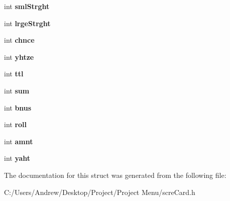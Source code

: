 \begin{DoxyCompactItemize}
int {\bfseries sml\+Strght}
\item 
\mbox{\label{structscre_card_a337ee925dc5831958deb35df999272de}} 
int {\bfseries lrge\+Strght}
\item 
\mbox{\label{structscre_card_a51c57ac55b54259138ee5050737870f3}} 
int {\bfseries chnce}
\item 
\mbox{\label{structscre_card_a8e09c3ec5e587e509d328af285e028b8}} 
int {\bfseries yhtze}
\item 
\mbox{\label{structscre_card_abbef5f6461fd43f42b5cbc3d80201965}} 
int {\bfseries ttl}
\item 
\mbox{\label{structscre_card_a3d1894a3cb33c1dddca4488f5b24d3aa}} 
int {\bfseries sum}
\item 
\mbox{\label{structscre_card_a236a10cc04262b34ec7f451ce48d6601}} 
int {\bfseries bnus}
\item 
\mbox{\label{structscre_card_a8a26609e3af7188b3de9aafdfbfe7322}} 
int {\bfseries roll}
\item 
\mbox{\label{structscre_card_a110c480d7941945972c62ec1858b3ce8}} 
int {\bfseries amnt}
\item 
\mbox{\label{structscre_card_acad4ba6ad4d766bbdb27529f24bfcf76}} 
int {\bfseries yaht}
\end{DoxyCompactItemize}


The documentation for this struct was generated from the following file\+:\begin{DoxyCompactItemize}
\item 
C\+:/\+Users/\+Andrew/\+Desktop/\+Project/\+Project Menu/scre\+Card.\+h\end{DoxyCompactItemize}
